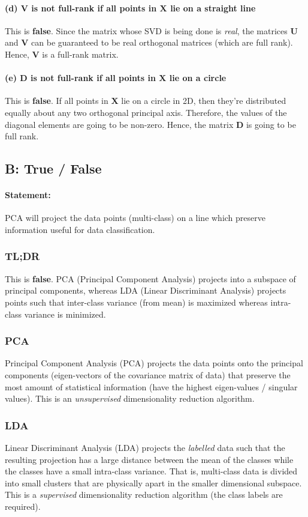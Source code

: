 \paragraph{(d) $\mathbf{V}$ is not full-rank if all points in $\mathbf{X}$ lie on a straight line}
This is \textbf{false}. Since the matrix whose SVD is being done is \textit{real}, the matrices $\mathbf{U}$ and $\mathbf{V}$ can be guaranteed to be real orthogonal matrices (which are full rank). Hence, $\mathbf{V}$ is a full-rank matrix.

\paragraph{(e) $\mathbf{D}$ is not full-rank if all points in $\mathbf{X}$ lie on a circle}
This is \textbf{false}. If all points in $\mathbf{X}$ lie on a circle in 2D, then they're distributed equally about any two orthogonal principal axis. Therefore, the values of the diagonal elements are going to be non-zero. Hence, the matrix $\mathbf{D}$ is going to be full rank.

\subsection{B: True / False}

\paragraph{Statement: } PCA will project the data points (multi-class) on a line which preserve information useful for data classification.

\subsubsection*{TL;DR}
This is \textbf{false}. PCA (Principal Component Analysis) projects into a subspace of principal components, whereas LDA (Linear Discriminant Analysis) projects points such that inter-class variance (from mean) is maximized whereas intra-class variance is minimized.

\subsubsection*{PCA}
Principal Component Analysis (PCA) projects the data points onto the principal components (eigen-vectors of the covariance matrix of data) that preserve the most amount of statistical information (have the highest eigen-values / singular values). This is an \textit{unsupervised} dimensionality reduction algorithm.

\subsubsection*{LDA}
Linear Discriminant Analysis (LDA) projects the \textit{labelled} data such that the resulting projection has a large distance between the mean of the classes while the classes have a small intra-class variance. That is, multi-class data is divided into small clusters that are physically apart in the smaller dimensional subspace. This is a \textit{supervised} dimensionality reduction algorithm (the class labels are required).
